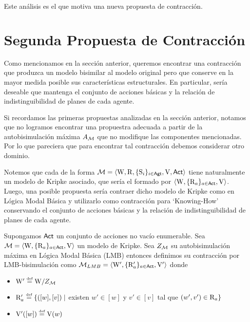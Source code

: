 Este análisis es el que motiva una nueva propuesta de contracción.

\section{Segunda Propuesta de Contracción}

Como mencionamos en la sección anterior, queremos encontrar una contracción que produzca un modelo bisimilar al modelo original pero que conserve 
en la mayor medida posible sus características estructurales. En particular, sería deseable que mantenga el conjunto de acciones básicas y la relación de 
indistinguibilidad de planes de cada agente.

Si recordamos las primeras propuestas analizadas en la sección anterior, notamos que no logramos encontrar una propuestra adecuada a partir de 
la autobisimulación máxima $A_{\mathcal{M}}$ que no modifique las componentes mencionadas. Por lo que pareciera que para encontrar tal contracción 
debemos considerar otro dominio.  

Notemos que cada \ults de la forma $\mathcal{M}=\langle \mathrm{W},\mathrm{R},\{ \mathrm{S}_i \}_{i \in {\rm \sf Agt}},\mathrm{V},{\rm \sf Act} \rangle$ tiene naturalmente un modelo de Kripke asociado, 
que sería el formado por $\langle \mathrm{W},\{\mathrm{R}_a\}_{a\in{\rm \sf Act}},\mathrm{V} \rangle$. Luego, una posible propuesta sería contraer dicho modelo de Kripke como en 
Lógica Modal Básica y utilizarlo como contracción para `Knowing-How' conservando el conjunto de acciones básicas y la relación de indistinguibilidad 
de planes de cada agente. 

\begin{definicion}
    Supongamos ${\rm \sf Act}$ un conjunto de acciones no vacío enumerable.
    Sea $\mathcal{M} = \langle \mathrm{W},\{\mathrm{R}_a\}_{a\in{\rm \sf Act}},\mathrm{V} \rangle$ un modelo de Kripke. Sea $Z_{\mathcal{M}}$ su autobisimulación máxima en Lógica Modal Básica (LMB) entonces definimos su contracción por LMB-bisimulación como $\mathcal{M}_{LMB} = \langle \mathrm{W}',\{\mathrm{R}'_a\}_{a\in{\rm \sf Act}},\mathrm{V}' \rangle$ donde
    \begin{center}
        \begin{itemize}
            \item $\W' \eqdef \W /Z_\modults$
            \item $\R_a' \eqdef \{([w],[v]) \mid$ existen $w' \in [w]$ y $v' \in [v]$ tal que $(w',v') \in \mathrm{R}_a \}$
            \item $\V'([w]) \eqdef \V(w)$
        \end{itemize}
    \end{center} 
\end{definicion}


